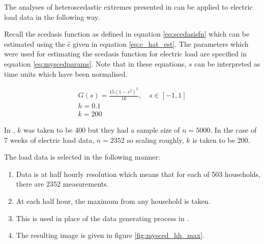 \documentclass[a4paper]{article}
\begin{document}




The analyses of heteroscedastic extremes presented in \cite{einmahl16} can be applied to electric load data in the following way.

Recall the scedasis function as defined in equation \ref{eq:scedasisfn} which can be estimated using the $\hat{c}$ given in equation \ref{eq:c_hat_est}. The parameters which were used for estimating the scedasis function for electric load are specified in equation \ref{eq:myscedparams}. Note that in these equations, $s$ can be interpreted as time units which have been normalised.

\begin{equation} \label{eq:myscedparams}
\begin{split}
G(s) = \frac{15(1-s^2)^2}{16}, \quad s \in [-1,1] \\
h = 0.1 \\
k = 200
\end{split}
\end{equation}

In \cite{einmahl16}, $k$ was taken to be 400 but they had a sample size of $n=5000$. In the case of 7 weeks of electric load data, $n=2352$ so scaling roughly, $k$ is taken to be 200.

The load data is selected in the following manner:
\begin{enumerate}
\item Data is at half hourly resolution which means that for each of 503 households, there are 2352 measurements.
\item At each half hour, the maximum from any household is taken.
\item This is used in place of the data generating process in \cite{einmahl16}.
\item The resulting image is given in figure \ref{fig:mysced_hh_max}.
\end{enumerate}
\end{document}
